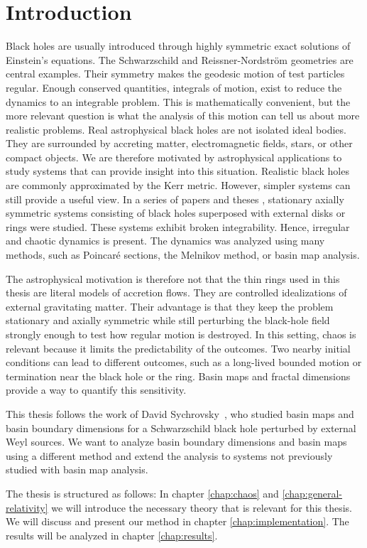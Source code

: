 \chapter*{Introduction}

Black holes are usually introduced through highly symmetric exact solutions of
Einstein's equations. The Schwarzschild and Reissner-Nordstr\"om geometries are
central examples. Their symmetry makes the geodesic motion of test particles
regular. Enough conserved quantities, integrals of motion, exist to reduce the dynamics to an
integrable problem. This is mathematically convenient, but the more relevant question is what the analysis of this motion can tell us about more realistic problems. Real astrophysical black holes are not isolated ideal bodies. They are
surrounded by accreting matter, electromagnetic fields, stars, or other compact
objects. We are therefore motivated by astrophysical applications to study systems that can provide insight into this situation. Realistic black holes are commonly approximated by the Kerr metric. However, simpler systems can still provide a useful view. In a series of papers and theses \cite{Semerak2016,Witzany2015,PolcarThesis2018,Polcar2019,PolcarSemerak2019, Kraus2025, Sychrovsky2020}, stationary axially symmetric systems consisting of black holes superposed with external disks or rings were studied. These systems exhibit broken integrability. Hence, irregular and chaotic dynamics is present. The dynamics was analyzed using many methods, such as Poincaré sections, the Melnikov method, or basin map analysis.

The astrophysical motivation is therefore not that the thin rings used in this
thesis are literal models of accretion flows. They are controlled idealizations
of external gravitating matter. Their advantage is that they keep the problem
stationary and axially symmetric while still perturbing the black-hole field
strongly enough to test how regular motion is destroyed. In this setting, chaos
is relevant because it limits the predictability of the outcomes. Two nearby initial
conditions can lead to different outcomes, such as a long-lived bounded motion or
termination near the black hole or the ring. Basin maps and fractal dimensions
provide a way to quantify this sensitivity.

This thesis follows the work of David Sychrovsky~\cite{Sychrovsky2020}, who
studied basin maps and basin boundary dimensions for a Schwarzschild black hole
perturbed by external Weyl sources. We want to analyze basin boundary dimensions and basin maps using a different method and extend the analysis to systems not previously studied with basin map analysis.

The thesis is structured as follows:
In chapter \ref{chap:chaos} and \ref{chap:general-relativity} we will introduce the necessary theory that is relevant for this thesis. We will discuss and present our method in chapter \ref{chap:implementation}. The results will be analyzed in chapter \ref{chap:results}.

